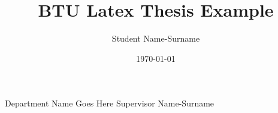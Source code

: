 \documentclass{btu_thesis}
\title{BTU Latex Thesis Example}
\author{Student Name-Surname}
\date{\today}
\begin{document}
	\startthesis

	\innercoverpage
		{Department Name Goes Here}
		{Supervisor Name-Surname}
\end{document}
